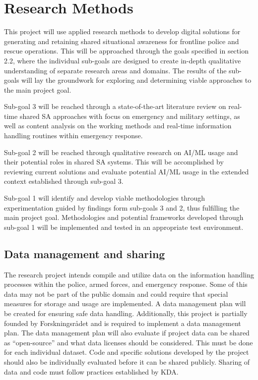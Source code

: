 \chapter{Research Methods}

This project will use applied research methods to develop digital solutions for generating and retaining shared situational awareness for frontline police and rescue operations. This will be approached through the goals specified in section 2.2, where the individual sub-goals are designed to create in-depth qualitative understanding of separate research areas and domains. The results of the sub-goals will lay the groundwork for exploring and determining viable approaches to the main project goal.

Sub-goal 3 will be reached through a state-of-the-art literature review on real-time shared SA approaches with focus on emergency and military settings, as well as content analysis on the working methods and real-time information handling routines within emergency response.

Sub-goal 2 will be reached through qualitative research on AI/ML usage and their potential roles in shared SA systems. This will be accomplished by reviewing current solutions and evaluate potential AI/ML usage in the extended context established through sub-goal 3. 

Sub-goal 1 will identify and develop viable methodologies through experimentation guided by findings form sub-goals 3 and 2, thus fulfilling the main project goal. Methodologies and potential frameworks developed through sub-goal 1 will be implemented and tested in an appropriate test environment. 

\section{Data management and sharing}
The research project intends compile and utilize data on the information handling processes within the police, armed forces, and emergency response. Some of this data may not be part of the public domain and could require that special measures for storage and usage are implemented. A data management plan will be created for ensuring safe data handling. Additionally, this project is partially founded by Forskningsrådet and is required to implement a data management plan. The data management plan will also evaluate if project data can be shared as “open-source” and what data licenses should be considered. This must be done for each individual dataset. Code and specific solutions developed by the project should also be individually evaluated before it can be shared publicly. Sharing of data and code must follow practices established by KDA. 
